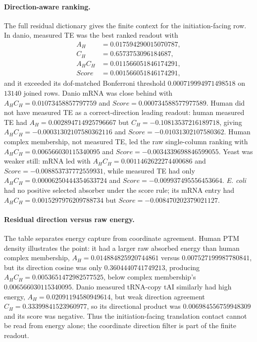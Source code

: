\paragraph{Direction-aware ranking.}
The full residual dictionary gives the finite context for the initiation-facing row.  In danio, measured TE was the best ranked readout with
$$
\begin{aligned}
A_H &=0.017594290015070787,\\
C_H &=0.6573753096184687,\\
A_H C_H &=0.011566051846174291,\\
Score &=0.001566051846174291,
\end{aligned}
$$
and it exceeded its dof-matched Bonferroni threshold $0.000719994971498518$ on $13140$ joined rows.  Danio mRNA was close behind with $A_H C_H=0.01073458857797759$ and $Score=0.000734588577977589$.  Human did not have measured TE as a correct-direction leading readout: human measured TE had $A_H=0.002894714925796667$ but $C_H=-0.10813537216189718$, giving $A_H C_H=-0.00031302107580362116$ and $Score=-0.01031302107580362$.  Human complex membership, not measured TE, led the raw single-column ranking with $A_H C_H=0.006566030115340095$ and $Score=-0.0034339698846599055$.  Yeast was weaker still: mRNA led with $A_H C_H=0.0011462622274400686$ and $Score=-0.008853737772559931$, while measured TE had only $A_H C_H=0.00006250444354633724$ and $Score=-0.009937495556453664$.  \emph{E. coli} had no positive selected absorber under the score rule; its mRNA entry had $A_H C_H=0.0015297976209788734$ but $Score=-0.008470202379021127$.

\paragraph{Residual direction versus raw energy.}
The table separates energy capture from coordinate agreement.  Human PTM density illustrates the point: it had a larger raw absorbed energy than human complex membership, $A_H=0.014884825920744861$ versus $0.007527199987780841$, but its direction cosine was only $0.3604440741749213$, producing $A_H C_H=0.0053651472982577525$, below complex membership's $0.006566030115340095$.  Danio measured tRNA-copy tAI similarly had high energy, $A_H=0.02091194580949614$, but weak direction agreement $C_H=0.33399841523960977$, so its directional product was $0.006984556759948309$ and its score was negative.  Thus the initiation-facing translation contact cannot be read from energy alone; the coordinate direction filter is part of the finite readout.

